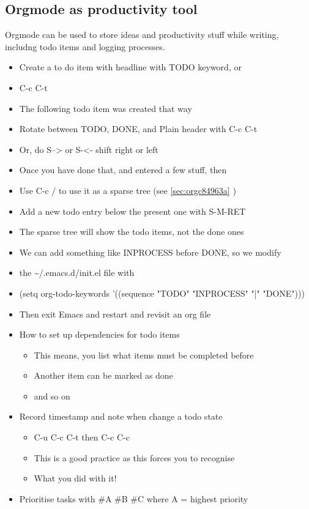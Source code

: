 \documentclass[11pt]{article}
\begin{document}
\subsection{Orgmode as productivity tool}
\label{sec:org01c902d}
Orgmode can be used to store ideas and productivity stuff while writing, includng todo items and logging processes.
\begin{itemize}
\item Create a to do item with headline with TODO keyword, or
\item C-c C-t
\item The following todo item was created that way
\item Rotate between TODO, DONE, and Plain header with C-c C-t
\item Or, do S--> or S-<- shift right or left
\item Once you have done that, and entered a few stuff, then
\item Use C-c / to use it as a sparse tree (see \ref{sec:orgc84963a} )
\item Add a new todo entry below the present one with S-M-RET
\item The sparse tree will show the todo items, not the done ones
\item We can add something like INPROCESS before DONE, so we modify
\item the \textasciitilde{}/.emacs.d/init.el file with
\item (setq org-todo-keywords
'((sequence "TODO" "INPROCESS" "|" "DONE")))
\item Then exit Emacs and restart and revisit an org file
\item How to set up dependencies for todo items
\begin{itemize}
\item This means, you list what items must be completed before
\item Another item can be marked as done
\item and so on
\end{itemize}
\item Record timestamp and note when change a todo state
\begin{itemize}
\item C-u C-c C-t then C-c C-c
\item This is a good practice as this forces you to recognise
\item What you did with it!
\end{itemize}
\item Prioritise tasks with \#A \#B \#C where A = highest priority
\end{itemize}
\end{document}
